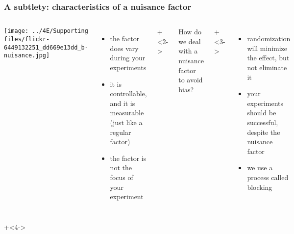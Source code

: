 \begin{frame}\frametitle{A subtlety: characteristics of a nuisance factor}
	\begin{columns}[T]

			\texttt{[image: ../4E/Supporting files/flickr-6449132251\_dd669e13dd\_b-nuisance.jpg]}

					
			
		
		\begin{itemize}
			\item	the factor does vary during your experiments
			\item	it is controllable, and it is measurable (just like a regular factor)
			\item	the factor is not the focus of your experiment

		\end{itemize}
		
			\onslide+<2->{
				

				\color{myOrange} How do we deal with a nuisance factor to avoid bias?
			}
			\onslide+<3->{
				\begin{itemize}
					\item	randomization will minimize the effect, but not eliminate it
					\item	your experiments should be successful, despite the nuisance factor
					\item	we use a process called {\color{purple} blocking}
				\end{itemize}
			}			
	\end{columns}
	
	\onslide+<4->{
		\vspace{0.5cm}
		
		\hbox{\hspace{-1.5em}
		}
		
	}
\end{frame}

